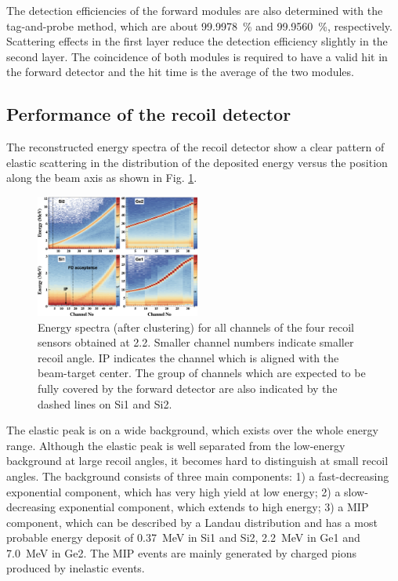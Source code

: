 \documentclass[number,5p]{elsarticle}
\begin{document}
The detection efficiencies of the forward modules are also determined with the
tag-and-probe method, which are about \SI{99.9978}{\percent} and \SI{99.9560}{\percent}, respectively.
Scattering effects in the first layer reduce the detection efficiency slightly in the second layer.
The coincidence of both modules is required to have a valid hit in the
forward detector and the hit time is the average of the two modules.

\subsection{Performance of the recoil detector}
\label{sec:recoil_performance}
The reconstructed energy spectra of the recoil detector show a clear pattern
of elastic scattering in the distribution of the deposited energy versus the
position along the beam axis as shown in Fig. \ref{fig:e_map}.
\begin{figure}[h!]
  \centering
  \includegraphics[width=0.48\textwidth]{./e_map.png}
  \caption{Energy spectra (after clustering) for all channels of the four recoil sensors obtained at \SI{2.2}{\momentum}.
    Smaller channel numbers indicate smaller recoil angle.
    IP indicates the channel which is aligned with
    the beam-target center.
    The group of channels which are expected to be fully covered by the forward detector are
    also indicated by the dashed lines on Si1 and Si2.
  }
  \label{fig:e_map}
\end{figure}
The elastic peak is on a wide background, which exists over the whole energy range.
Although the elastic peak is well separated from the low-energy background at
large recoil angles, it becomes hard to distinguish at small recoil angles.
The background consists of three main components:
1) a fast-decreasing exponential component, which has very high yield at low energy;
2) a slow-decreasing exponential component, which extends to high energy;
3) a MIP component, which can be described by a Landau distribution and has a most probable energy deposit of \SI{0.37}{\MeV} in Si1 and Si2, \SI{2.2}{\MeV} in Ge1 and \SI{7.0}{\MeV} in Ge2.
The MIP events are mainly generated by charged pions produced by inelastic events.
\end{document}
